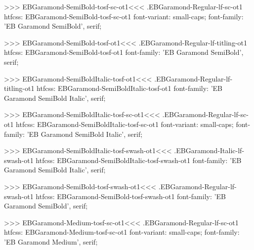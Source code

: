 {{{{{{{>>>
\<EBGaramond-SemiBold-tosf-sc-ot1\><<<
.EBGaramond-Regular-lf-sc-ot1
htfcss:  EBGaramond-SemiBold-tosf-sc-ot1  font-variant: small-caps; font-family: 'EB Garamond SemiBold', serif;

>>>
\<EBGaramond-SemiBold-tosf-ot1\><<<
.EBGaramond-Regular-lf-titling-ot1
htfcss:  EBGaramond-SemiBold-tosf-ot1  font-family: 'EB Garamond SemiBold', serif;

>>>
\<EBGaramond-SemiBoldItalic-tosf-ot1\><<<
.EBGaramond-Regular-lf-titling-ot1
htfcss:  EBGaramond-SemiBoldItalic-tosf-ot1  font-family: 'EB Garamond SemiBold Italic', serif;

>>>
\<EBGaramond-SemiBoldItalic-tosf-sc-ot1\><<<
.EBGaramond-Regular-lf-sc-ot1
htfcss:  EBGaramond-SemiBoldItalic-tosf-sc-ot1  font-variant: small-caps; font-family: 'EB Garamond SemiBold Italic', serif;

>>>
\<EBGaramond-SemiBoldItalic-tosf-swash-ot1\><<<
.EBGaramond-Italic-lf-swash-ot1
htfcss:  EBGaramond-SemiBoldItalic-tosf-swash-ot1  font-family: 'EB Garamond SemiBold Italic', serif;

>>>
\<EBGaramond-SemiBold-tosf-swash-ot1\><<<
.EBGaramond-Regular-lf-swash-ot1
htfcss:  EBGaramond-SemiBold-tosf-swash-ot1  font-family: 'EB Garamond SemiBold', serif;

>>>
\<EBGaramond-Medium-tosf-sc-ot1\><<<
.EBGaramond-Regular-lf-sc-ot1
htfcss:  EBGaramond-Medium-tosf-sc-ot1  font-variant: small-caps; font-family: 'EB Garamond Medium', serif;

}}}}}}}
